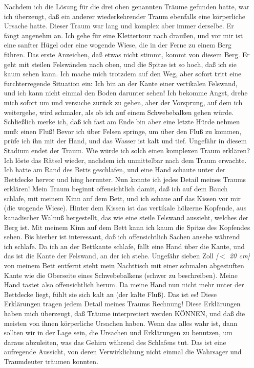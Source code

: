 Nachdem ich die Lösung für die drei oben genannten Träume gefunden hatte, war ich überzeugt, daß ein anderer wiederkehrender Traum ebenfalls eine körperliche Ursache hatte.
 Dieser Traum war lang und komplex aber immer derselbe.
 Er fängt angenehm an.
 Ich gehe für eine Klettertour nach draußen, und vor mir ist eine sanfter Hügel oder eine wogende Wiese, die in der Ferne zu einem Berg führen.
 Das erste Anzeichen, daß etwas nicht stimmt, kommt von diesem Berg.
 Er geht mit steilen Felswänden nach oben, und die Spitze ist so hoch, daß ich sie kaum sehen kann.
 Ich mache mich trotzdem auf den Weg, aber sofort tritt eine furchterregende Situation ein: Ich bin an der Kante einer vertikalen Felswand, und ich kann nicht einmal den Boden darunter sehen!
 Ich bekomme Angst, drehe mich sofort um und versuche zurück zu gehen, aber der Vorsprung, auf dem ich weitergehe, wird schmaler, als ob ich auf einem Schwebebalken gehen würde.
 Schließlich merke ich, daß ich fast am Ende bin aber eine letzte Hürde nehmen muß: einen Fluß!
 Bevor ich über Felsen springe, um über den Fluß zu kommen, prüfe ich ihn mit der Hand, und das Wasser ist kalt und tief.
 Ungefähr in diesem Stadium endet der Traum.
 Wie würde ich solch einen komplexen Traum erklären?
 Ich löste das Rätsel wieder, nachdem ich unmittelbar nach dem Traum erwachte.
 Ich hatte am Rand des Betts geschlafen, und eine Hand schaute unter der Bettdecke hervor und hing herunter.
 Nun konnte ich jedes Detail meines Traums erklären!
 Mein Traum beginnt offensichtlich damit, daß ich auf dem Bauch schlafe, mit meinem Kinn auf dem Bett, und ich schaue auf das Kissen vor mir (die wogende Wiese).
 Hinter dem Kissen ist das vertikale hölzerne Kopfende, aus kanadischer Walnuß hergestellt, das wie eine steile Felswand aussieht, welches der Berg ist.
 Mit meinem Kinn auf dem Bett kann ich kaum die Spitze des Kopfendes sehen.
 Bis hierher ist interessant, daß ich offensichtlich Sachen ansehe während ich schlafe.
 Da ich an der Bettkante schlafe, fällt eine Hand über die Kante, und das ist die Kante der Felswand, an der ich stehe.
 Ungefähr sieben Zoll \textit{[$<$ 20 cm]} von meinem Bett entfernt steht mein Nachttisch mit einer schmalen abgestuften Kante wie die Oberseite eines Schwebebalkens (schwer zu beschreiben).
 Meine Hand tastet also offensichtlich herum.
 Da meine Hand nun nicht mehr unter der Bettdecke liegt, fühlt sie sich kalt an (der kalte Fluß). Das ist es!
 Diese Erklärungen tragen jedem Detail meines Traums Rechnung!
 Diese Erklärungen haben mich überzeugt, daß Träume interpretiert werden KÖNNEN, und daß die meisten von ihnen körperliche Ursachen haben.
 Wenn das alles wahr ist, dann sollten wir in der Lage sein, die Ursachen und Erklärungen zu benutzen, um daraus abzuleiten, was das Gehirn während des Schlafens tut.
 Das ist eine aufregende Aussicht, von deren Verwirklichung nicht einmal die Wahrsager und Traumdeuter träumen konnten.
 \hypertarget{c3_5f}{}

